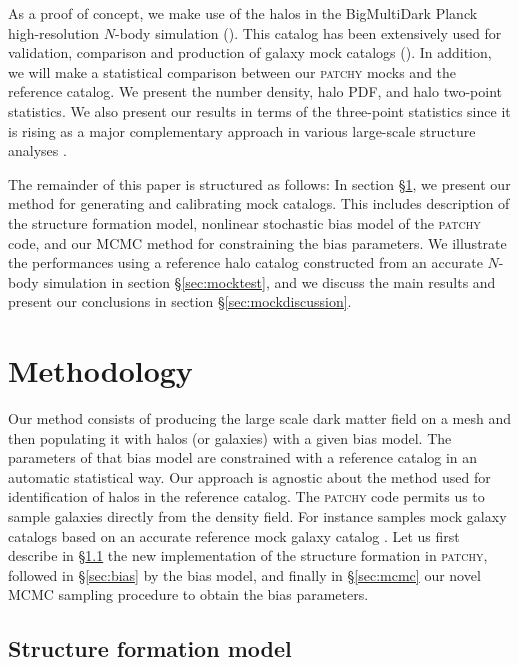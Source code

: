 As a proof of concept, we make use of the halos in the BigMultiDark Planck high-resolution $N$-body simulation (\citealt{multidark}). This catalog has been extensively used for validation, comparison and production of galaxy mock catalogs (\citealt{chuang2015,zhao2015,kitaura2016,sergio2016}). 
In addition, we will make a statistical comparison between our \textsc{patchy} mocks and the reference catalog. We present the number density, halo PDF, and halo two-point statistics. 
We also present our results in terms of the three-point statistics since it is rising as a major complementary approach in various large-scale structure analyses \citep{slepian2015,gill2015a,gill2015b,guo2016,slepian2016a,slepian2016b,gill2017}. 


The remainder of this paper is structured as follows: In section \S \ref{sec:mockmethod}, we present our method for generating and calibrating mock catalogs. This includes description of the structure formation model, nonlinear stochastic bias model of the \textsc{patchy} code, and our MCMC method for constraining the bias parameters. We illustrate the performances using a reference halo catalog constructed from an accurate $N$-body simulation in section \S \ref{sec:mocktest}, and we discuss the main results and present our conclusions in section \S \ref{sec:mockdiscussion}.

\section{Methodology}
\label{sec:mockmethod}

Our method consists of producing the large scale dark matter field on a mesh and then populating it with halos (or galaxies) with a given bias model. The parameters of that bias model are constrained with a reference catalog in an automatic statistical way. 
Our approach is agnostic about the method used for identification of halos in the reference catalog. The \textsc{patchy} code permits us to sample galaxies directly from the density field. For instance \citet{kitaura2016} samples mock galaxy catalogs based on an accurate reference mock galaxy catalog \citep{sergio2016}. 
Let us first describe in \S \ref{sec:sf} the new implementation of the structure formation in \textsc{patchy}, followed in \S \ref{sec:bias} by the bias model, and finally in  \S \ref{sec:mcmc} our novel MCMC sampling procedure to obtain the bias parameters. 


\subsection{Structure formation model}
\label{sec:sf}

